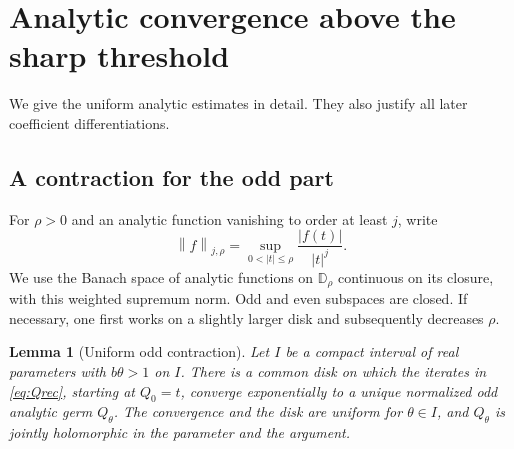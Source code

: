 \documentclass[11pt]{article}
\newtheorem{lemma}[theorem]{Lemma}
\theoremstyle{definition}
\newcommand{\norm}[1]{\left\lVert #1\right\rVert}
\newcommand{\Disk}{\mathbb D}
\begin{document}
\section{Analytic convergence above the sharp threshold}

We give the uniform analytic estimates in detail. They also justify all
later coefficient differentiations.

\subsection{A contraction for the odd part}

For $\rho>0$ and an analytic function vanishing to order at least $j$,
write
\[
 \norm{f}_{j,\rho}=\sup_{0<|t|\leq\rho}\frac{|f(t)|}{|t|^j}.
\]
We use the Banach space of analytic functions on $\Disk_\rho$ continuous
on its closure, with this weighted supremum norm. Odd and even
subspaces are closed. If necessary, one first works on a slightly
larger disk and subsequently decreases $\rho$.

\begin{lemma}[Uniform odd contraction]\label{lem:odd-contraction}
Let $I$ be a compact interval of real parameters with $b\theta>1$ on
$I$. There is a common disk on which the iterates in
\eqref{eq:Qrec}, starting at $Q_0=t$, converge exponentially to a
unique normalized odd analytic germ $Q_\theta$. The convergence and
the disk are uniform for $\theta\in I$, and $Q_\theta$ is jointly
holomorphic in the parameter and the argument.
\end{lemma}
\end{document}
